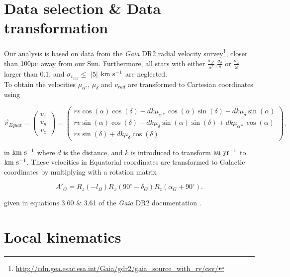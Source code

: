 \documentclass{aastex62}
\begin{document}
	\section{Data selection \& Data transformation} 

	Our analysis is based on data from the \textit{Gaia} DR2 radial velocity survey\footnote{\url{http://cdn.gea.esac.esa.int/Gaia/gdr2/gaia_source_with_rv/csv/}}, closer than $100\rm pc$ away from our Sun. Furthermore, all stars with either $\frac{\sigma_{\alpha^*}}{\alpha^*}$,$\frac{\sigma_{\delta}}{\delta}$ or $\frac{\sigma_{\bar{\omega}}}{\bar{\omega}}$ larger than $0.1$, and $\sigma_{v_{rad}}\leq$ $|5|$ $\rm km~s^{-1}$ are neglected.
	\\
	To obtain the velocities $\mu_{\alpha^*}$, $\mu_{\delta}$ and $v_{rad}$ are transformed to Cartesian coordinates using
	
	\begin{equation}
	\vec{v}_{Equat} = 
	\left(
	\begin{array}{c}
	v_x\\
	v_y\\
	v_z
	\end{array}
	\right) =
	\left(
	\begin{array}{c}
	rv \cos{(\alpha)} \cos{(\delta)} - d k \mu_{\alpha*} \cos{(\alpha)} \sin{(\delta)} - d k \mu_{\delta} \sin{(\alpha)}\\
	rv \sin{(\alpha)} \cos{(\delta)} - d k  \mu_{\delta} \sin{(\alpha)} \sin{(\delta)} + d k \mu_{\alpha*} \cos{(\alpha)}\\
	rv \sin{(\delta)} + d k \mu_{\delta} \cos{(\delta)}
	\end{array}
	\right),	
	\end{equation}
	
	\noindent
	in $\rm km~s^{-1}$ where $d$ is the distance, and $k$ is introduced to transform $\rm au~yr^{-1}$ to $\rm km~s^{-1}$. These velocities in Equatorial coordinates are transformed to Galactic coordinates by multiplying with a rotation matrix
	
	\begin{equation}
	\mathbf{\textit{A}}{'}_{G}=\mathbf{\textit{R}}_{z}(-l_{\Omega})\mathbf{\textit{R}}_{x}(90^\circ-\delta_G)\mathbf{\textit{R}}_z(\alpha_G+90^\circ).
	\end{equation}
	
	given in equations 3.60 \& 3.61 of the \textit{Gaia} DR2 documentation \citep{documentation}.
	
	\section{Local kinematics}
\end{document}
